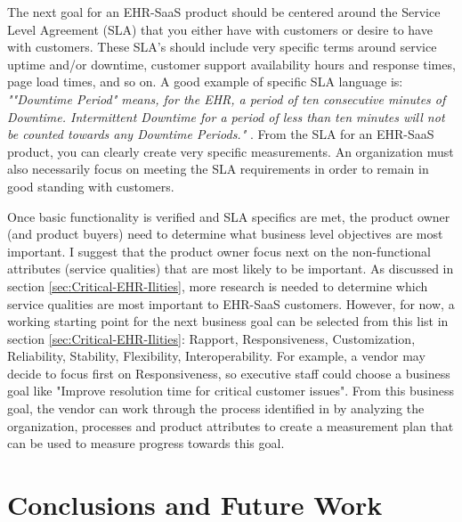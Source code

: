 \documentclass[10pt]{article}
\begin{document}
The next goal for an EHR-SaaS product should be centered around the Service Level Agreement (SLA) that you either have with customers or desire to have with customers.
These SLA's should include very specific terms around service uptime and/or downtime, customer support availability hours and response times, page load times, and so on.
A good example of specific SLA language is: \emph{""Downtime Period" means, for the EHR, a period of ten consecutive minutes of Downtime. Intermittent Downtime for a period of less than ten minutes will not be counted towards any Downtime Periods."} \cite{emr-sla-example}. 
From the SLA for an EHR-SaaS product, you can clearly create very specific measurements.
An organization must also necessarily focus on meeting the SLA requirements in order to remain in good standing with customers.

Once basic functionality is verified and SLA specifics are met, the product owner (and product buyers) need to determine what business level objectives are most important.
I suggest that the product owner focus next on the non-functional attributes (service qualities) that are most likely to be important.
As discussed in section \ref{sec:Critical-EHR-Ilities}, more research is needed to determine which service qualities are most important to EHR-SaaS customers.
However, for now, a working starting point for the next business goal can be selected from this list in section \ref{sec:Critical-EHR-Ilities}: Rapport, Responsiveness, Customization, Reliability, Stability, Flexibility, Interoperability.
For example, a vendor may decide to focus first on Responsiveness, so executive staff could choose a business goal like "Improve resolution time for critical customer issues".
From this business goal, the vendor can work through the process identified in \cite{sei-gqim} by analyzing the organization, processes and product attributes to create a measurement plan that can be used to measure progress towards this goal.

\section{Conclusions and Future Work}
\end{document}
